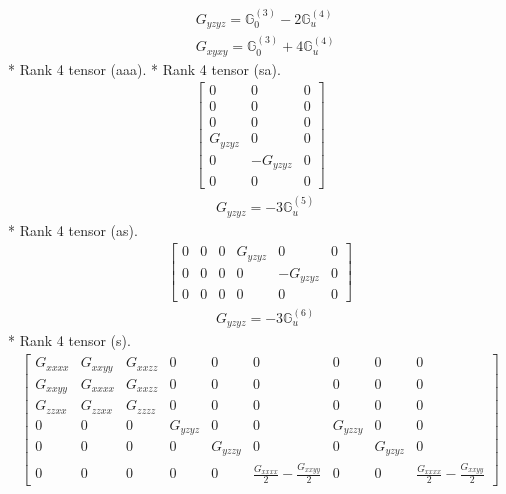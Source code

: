 \documentclass[fleqn,8pt,landscape]{jsarticle}
\begin{document}
\begin{align*}
& G_{yzyz} = \mathbb{G}_{0}^{(3)} - 2 \mathbb{G}_{u}^{(4)} \\
& G_{xyxy} = \mathbb{G}_{0}^{(3)} + 4 \mathbb{G}_{u}^{(4)}
\end{align*}
* Rank 4 tensor (aaa).
* Rank 4 tensor (sa).
\begin{align*}
\begin{bmatrix} 0 & 0 & 0 \\ 0 & 0 & 0 \\ 0 & 0 & 0 \\ G_{yzyz} & 0 & 0 \\ 0 & - G_{yzyz} & 0 \\ 0 & 0 & 0 \end{bmatrix}
\end{align*}
\begin{align*}
& G_{yzyz} = - 3 \mathbb{G}_{u}^{(5)}
\end{align*}
* Rank 4 tensor (as).
\begin{align*}
\begin{bmatrix} 0 & 0 & 0 & G_{yzyz} & 0 & 0 \\ 0 & 0 & 0 & 0 & - G_{yzyz} & 0 \\ 0 & 0 & 0 & 0 & 0 & 0 \end{bmatrix}
\end{align*}
\begin{align*}
& G_{yzyz} = - 3 \mathbb{G}_{u}^{(6)}
\end{align*}
* Rank 4 tensor (s).
\begin{align*}
\begin{bmatrix} G_{xxxx} & G_{xxyy} & G_{xxzz} & 0 & 0 & 0 & 0 & 0 & 0 \\ G_{xxyy} & G_{xxxx} & G_{xxzz} & 0 & 0 & 0 & 0 & 0 & 0 \\ G_{zzxx} & G_{zzxx} & G_{zzzz} & 0 & 0 & 0 & 0 & 0 & 0 \\ 0 & 0 & 0 & G_{yzyz} & 0 & 0 & G_{yzzy} & 0 & 0 \\ 0 & 0 & 0 & 0 & G_{yzzy} & 0 & 0 & G_{yzyz} & 0 \\ 0 & 0 & 0 & 0 & 0 & \frac{G_{xxxx}}{2} - \frac{G_{xxyy}}{2} & 0 & 0 & \frac{G_{xxxx}}{2} - \frac{G_{xxyy}}{2} \end{bmatrix}
\end{align*}
\end{document}
